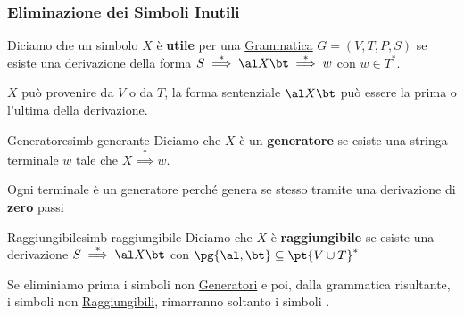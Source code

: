 \subsubsection{Eliminazione dei Simboli Inutili}\label{sub:ll_eliminazione_dei_simboli_inutili} %
Diciamo che un simbolo $X$ è \textbf{utile} per una \hyperref[def:cfg]{Grammatica} $G = (V,T,P,S)$ se esiste una derivazione della forma $S \overset{*}{\implies}\al X\bt \overset{*}{\implies} w$ con $w \in T^*$.
\begin{note}
    $X$ può provenire da $V$ o da $T$, la forma sentenziale $\al X\bt$ può essere la prima o l'ultima della derivazione.
\end{note}
\begin{definition}{Generatore}{simb-generante}
    Diciamo che $X$ è un \textbf{generatore} se esiste una stringa terminale $w$ tale che $X \overset{*}{\implies}w$.
    \begin{note}
        Ogni terminale è un generatore perché genera se stesso tramite una derivazione di \textbf{zero} passi
    \end{note}
\end{definition}
\begin{definition}{Raggiungibile}{simb-raggiungibile}
    Diciamo che $X$ è \textbf{raggiungibile} se esiste una derivazione $S \overset{*}{\implies}\al X\bt$ con $\pg{\al,\bt} \subseteq \pt{V\cup T}^*$
\end{definition}
\begin{note}
    Se eliminiamo prima i simboli non \hyperref[def:simb-generante]{Generatori} e poi, dalla grammatica risultante, i simboli non \hyperref[def:simb-raggiungibile]{Raggiungibili}, rimarranno soltanto i simboli .
\end{note}
